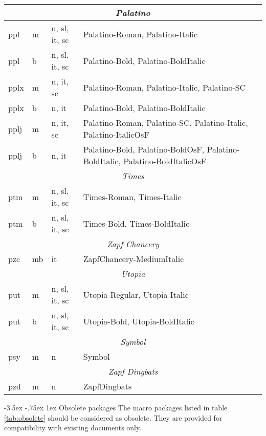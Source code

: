 \documentclass[11pt]{ltxguide}[1995/11/28]
\makeatletter
\renewcommand\section{\@startsection{section}{1}{\z@}%
{-3.5ex \@plus -.75ex}%
{1ex}%
{\normalfont\Large\bfseries}}
\makeatother
\begin{document}
\begin{table}[p]
{\begin{tabularx}{\linewidth}{|l|l|l|>{\raggedright\arraybackslash}X|}
  \multicolumn{4}{|c|}{\textit{Palatino}}\\ \hline
   ppl & m & n, sl, it, sc & Palatino-Roman, Palatino-Italic\\ \hline
   ppl & b & n, sl, it, sc & Palatino-Bold, Palatino-BoldItalic\\ \hline
   pplx & m & n, it, sc & Palatino-Roman, Palatino-Italic, Palatino-SC\\ \hline
   pplx & b & n, it     & Palatino-Bold, Palatino-BoldItalic\\ \hline
   pplj & m & n, it, sc & Palatino-Roman, Palatino-SC, Palatino-Italic, Palatino-ItalicOsF\\ \hline
   pplj & b & n, it     & Palatino-Bold, Palatino-BoldOsF, Palatino-BoldItalic, Palatino-BoldItalicOsF\\ \hline \hline
  \multicolumn{4}{|c|}{\textit{Times}}\\ \hline
   ptm & m & n, sl, it, sc  & Times-Roman, Times-Italic\\ \hline
   ptm & b & n, sl, it, sc  & Times-Bold, Times-BoldItalic\\ \hline \hline
  \multicolumn{4}{|c|}{\textit{Zapf Chancery}}\\ \hline
   pzc & mb & it & ZapfChancery-MediumItalic\\ \hline \hline
  \multicolumn{4}{|c|}{\textit{Utopia}}\\ \hline
   put & m & n, sl, it, sc & Utopia-Regular, Utopia-Italic\\ \hline
   put & b & n, sl, it, sc & Utopia-Bold, Utopia-BoldItalic\\ \hline \hline
  \multicolumn{4}{|c|}{\textit{Symbol}}\\ \hline
   psy & m & n & Symbol\\ \hline \hline
  \multicolumn{4}{|c|}{\textit{Zapf Dingbats}}\\ \hline
   pzd & m & n & ZapfDingbats\\ \hline
  \end{tabularx}
  \par}
\end{table}



\section{Obsolete packages}
The macro packages listed in table \vref{tab:obsolete} should be considered as obsolete.
They are provided for compatibility with existing documents only.
\end{document}
